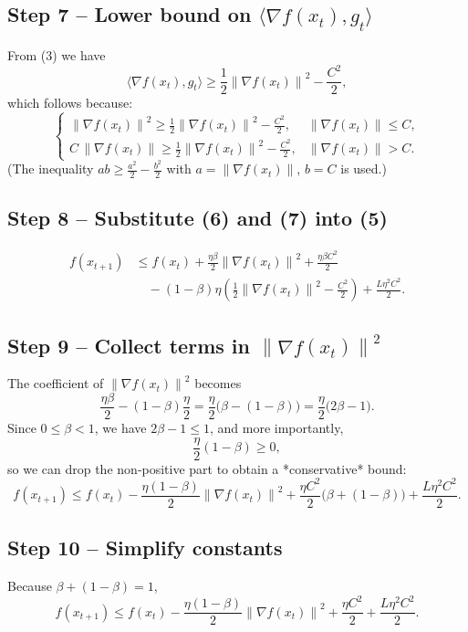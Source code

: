 \documentclass{article}
\newcommand{\norm}[1]{\left\lVert #1\right\rVert}
\newcommand{\grad}{\nabla}
\begin{document}
\subsection*{Step 7 – Lower bound on $\langle\grad f(x_t),g_t\rangle$}
From (3) we have
\[
\langle\grad f(x_t),g_t\rangle
\ge \frac{1}{2}\norm{\grad f(x_t)}^2 - \frac{C^2}{2},
\tag{7}
\]
which follows because:
\[
\begin{cases}
\norm{\grad f(x_t)}^2 \ge \frac{1}{2}\norm{\grad f(x_t)}^2 - \frac{C^2}{2}, &\norm{\grad f(x_t)}\le C,\\[4pt]
C\,\norm{\grad f(x_t)} \ge \frac{1}{2}\norm{\grad f(x_t)}^2 - \frac{C^2}{2}, &\norm{\grad f(x_t)}>C.
\end{cases}
\]
(The inequality $ab\ge \frac{a^2}{2}-\frac{b^2}{2}$ with $a=\norm{\grad f(x_t)}$, $b=C$ is used.)

\subsection*{Step 8 – Substitute (6) and (7) into (5)}
\[
\begin{aligned}
f(x_{t+1})
&\le f(x_t)
+\frac{\eta\beta}{2}\norm{\grad f(x_t)}^2
+ \frac{\eta\beta C^2}{2}   \\
&\quad -(1-\beta)\eta\!\left(\frac{1}{2}\norm{\grad f(x_t)}^2-\frac{C^2}{2}\right)
+ \frac{L\eta^2 C^2}{2} .
\end{aligned}
\tag{8}
\]

\subsection*{Step 9 – Collect terms in $\norm{\grad f(x_t)}^2$}
The coefficient of $\norm{\grad f(x_t)}^2$ becomes
\[
\frac{\eta\beta}{2}-(1-\beta)\frac{\eta}{2}
= \frac{\eta}{2}\bigl(\beta-(1-\beta)\bigr)
= \frac{\eta}{2}\bigl(2\beta-1\bigr).
\]
Since $0\le\beta<1$, we have $2\beta-1\le 1$, and more importantly,
\[
\frac{\eta}{2}(1-\beta)\ge 0,
\]
so we can drop the non‑positive part to obtain a *conservative* bound:
\[
f(x_{t+1})\le f(x_t) - \frac{\eta(1-\beta)}{2}\norm{\grad f(x_t)}^2
+ \frac{\eta C^2}{2}\bigl(\beta+ (1-\beta)\bigr)
+ \frac{L\eta^2 C^2}{2}.
\tag{9}
\]

\subsection*{Step 10 – Simplify constants}
Because $\beta+(1-\beta)=1$,
\[
f(x_{t+1})\le f(x_t) - \frac{\eta(1-\beta)}{2}\norm{\grad f(x_t)}^2
+ \frac{\eta C^2}{2}
+ \frac{L\eta^2 C^2}{2}.
\tag{10}
\]
\end{document}
